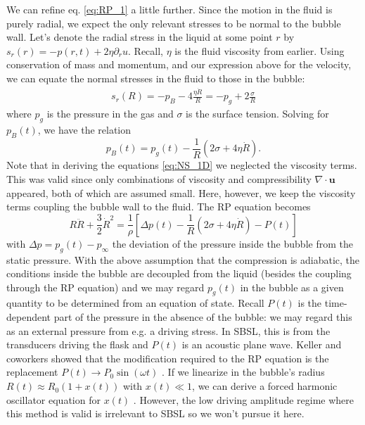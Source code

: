 \documentclass[prb,aps,nofootinbib,superscriptaddress,floatfix]{revtex4-2}
\begin{document}
We can refine eq. \ref{eq:RP_1} a little further. Since the motion in the fluid is purely radial, we expect the only relevant stresses to be normal to the bubble wall. Let's denote the radial stress in the liquid at some point $r$ by $s_r(r)=-p(r,t)+2\eta \partial_r u$. Recall, $\eta$ is the fluid viscosity from earlier. Using conservation of mass and momentum, and our expression above for the velocity, we can equate the normal stresses in the fluid to those in the bubble:
\begin{equation}
\begin{split}
    s_r(R)=-p_B-4\frac{\eta \dot{R}}{R}=-p_g+2\frac{\sigma}{R}
\end{split}
\end{equation}
where $p_g$ is the pressure in the gas and $\sigma$ is the surface tension. Solving for $p_B(t)$, we have the relation \cite{brenner2002single,prosperetti1999old,prosperetti1986bubble}
\begin{equation}
    p_B(t)=p_g(t)-\frac{1}{R}\left( 2\sigma+4\eta \dot{R} \right)
    \label{eq:p_B}.
\end{equation}
Note that in deriving the equations \ref{eq:NS_1D} we neglected the viscosity terms. This was valid since only combinations of viscosity and compressibility $\nabla \cdot \bm{u}$ appeared, both of which are assumed small. Here, however, we keep the viscosity terms coupling the bubble wall to the fluid. The RP equation becomes 
\begin{equation}
    R\ddot{R}+\frac{3}{2}\dot{R}^2 = \frac{1}{\rho} \left[ \Delta p(t)-\frac{1}{R}\left( 2\sigma+4\eta \dot{R} \right)-P(t) \right]
    \label{eq:RP_2}
\end{equation}
with $\Delta p = p_g(t)-p_\infty$ the deviation of the pressure inside the bubble from the static pressure. With the above assumption that the compression is adiabatic, the conditions inside the bubble are decoupled from the liquid (besides the coupling through the RP equation) and we may regard $p_g(t)$ in the bubble as a given quantity to be determined from an equation of state. Recall $P(t)$ is the time-dependent part of the pressure in the absence of the bubble: we may regard this as an external pressure from e.g. a driving stress. In SBSL, this is from the transducers driving the flask and $P(t)$ is an acoustic plane wave. Keller and coworkers showed that the modification required to the RP equation is the replacement $P(t) \rightarrow P_0 \sin(\omega t)$ \cite{keller1980bubble}. If we linearize in the bubble's radius $R(t)\approx R_0 \left( 1+x(t) \right)$ with $x(t) \ll 1$, we can derive a forced harmonic oscillator equation for $x(t)$ \cite{brennen2014cavitation,yasui2018acoustic}. However, the low driving amplitude regime where this method is valid is irrelevant to SBSL so we won't pursue it here.
\end{document}
